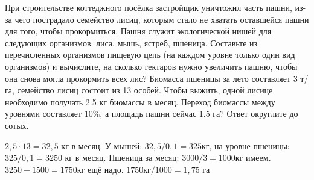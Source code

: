 
При
строительстве коттеджного посёлка застройщик уничтожил часть пашни, из-за чего
пострадало семейство лисиц, которым стало не хватать оставшейся пашни для того,
чтобы прокормиться. Пашня служит экологической нишей для следующих организмов:
лиса, мышь, ястреб, пшеница. Составьте из перечисленных организмов пищевую цепь (на каждом уровне только один вид организмов) и вычислите, на сколько гектаров нужно увеличить пашню, чтобы она снова могла
прокормить всех лис? Биомасса пшеницы за лето составляет 3 т/га, семейство лисиц
состоит из 13  особей. Чтобы выжить, одной лисице необходимо получать 2.5 кг
биомассы в месяц. Переход биомассы между уровнями составляет $10\%$, а площадь
пашни сейчас 1.5 га? Ответ округлите до сотых.

\solutionSection

$2,5 \cdot 13=32,5$ кг в месяц. У мышей: $32,5/0,1 = 325$кг, на уровне пшеницы: $325/0,1 = 3250$ кг в месяц. 
Пшеница за месяц: $3000/3=1000$кг имеем. $3250-1500 = 1750$кг ещё надо. $1750кг/1000=1,75$ га

